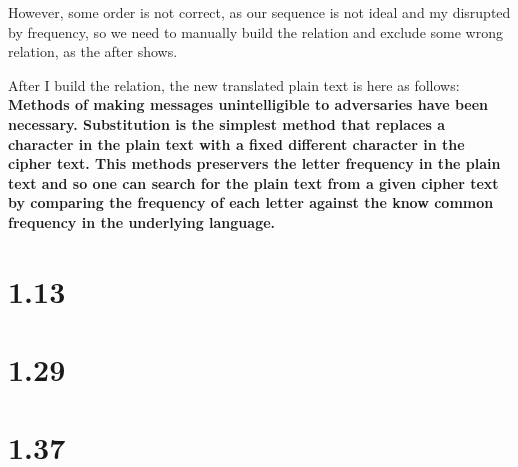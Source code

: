 \documentclass{article}
\begin{document}
However, some order is not correct, as our sequence is not ideal and my disrupted by frequency, so we need to manually
build the relation and exclude some wrong relation, as the after shows.

After I build the relation, the new translated plain text is here as follows:
\textbf{Methods of making messages unintelligible to adversaries have been necessary.
Substitution is the simplest method that replaces a character in the plain text 
with a fixed different character in the cipher text. This methods preservers 
the letter frequency in the plain text and so one can search for the plain text
from a given cipher text by comparing the frequency of each letter against 
the know common frequency in the underlying language.}

\section{1.13}


\section{1.29}


\section{1.37}
\end{document}
